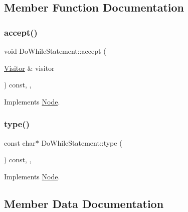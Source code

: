 \subsection{Member Function Documentation}
\mbox{\label{struct_do_while_statement_afa4ddac75d1899fa41a134a49aa9c48f}} 
\subsubsection{\texorpdfstring{accept()}{accept()}}
{\footnotesize\ttfamily void Do\+While\+Statement\+::accept (\begin{DoxyParamCaption}\item[{\hyperlink{struct_visitor}{Visitor} \&}]{visitor }\end{DoxyParamCaption}) const\hspace{0.3cm}{\ttfamily [inline]}, {\ttfamily [override]}, {\ttfamily [virtual]}}



Implements \hyperlink{struct_node_a10bd7af968140bbf5fa461298a969c71}{Node}.

\mbox{\label{struct_do_while_statement_a91437b71a28b99c4cef7086dd89033ac}} 
\subsubsection{\texorpdfstring{type()}{type()}}
{\footnotesize\ttfamily const char$\ast$ Do\+While\+Statement\+::type (\begin{DoxyParamCaption}{ }\end{DoxyParamCaption}) const\hspace{0.3cm}{\ttfamily [inline]}, {\ttfamily [override]}, {\ttfamily [virtual]}}



Implements \hyperlink{struct_node_a82f29420d0a38efcc370352528e94e9b}{Node}.



\subsection{Member Data Documentation}
\mbox{\label{struct_do_while_statement_a1742b816c78d6cfd511e69317461b52a}} 

